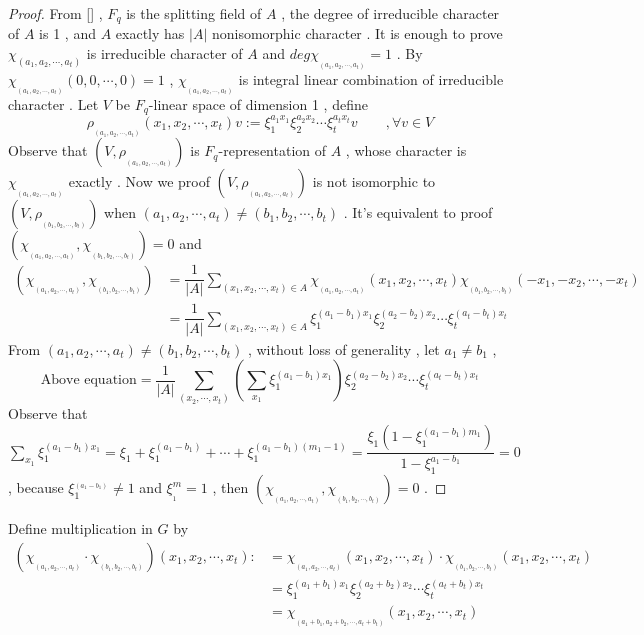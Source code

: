 \documentclass{article}
\begin{document}
\begin{proof}
    From [] , $F_q$ is the splitting field of $A$ , the degree of irreducible character of $A$ is 1 , and $A$ exactly has $|A|$ nonisomorphic character . It is enough to prove $\chi_{(a_1,a_2,\cdots,a_t)}$ is irreducible character of $A$ and $deg\chi_{_{(a_1,a_2,\cdots,a_t)}}=1$ . By $\chi_{_{(a_1,a_2,\cdots,a_t)}}(0,0,\cdots,0)=1$ , $\chi_{_{(a_1,a_2,\cdots,a_t)}}$ is integral linear combination of irreducible character . Let $V$ be $F_q$-linear space of dimension 1 , define 
    \begin{equation*}
        \rho_{_{(a_1,a_2,\cdots,a_t)}}(x_1,x_2,\cdots,x_t)v:=\xi_1^{a_1x_1}\xi_2^{a_2x_2}\cdots\xi_t^{a_tx_t}v\qquad ,\forall v\in{V}
    \end{equation*}
    Observe that $(V,\rho_{_{(a_1,a_2,\cdots,a_t)}})$ is $F_q$-representation of $A$ , whose character is $\chi_{_{(a_1,a_2,\cdots,a_t)}}$ exactly . Now we proof $(V,\rho_{_{(a_1,a_2,\cdots,a_t)}})$ is not isomorphic to $(V,\rho_{_{(b_1,b_2,\cdots,b_t)}})$ when $(a_1,a_2,\cdots,a_t)\neq(b_1,b_2,\cdots,b_t)$ . It's equivalent to proof $(\chi_{_{(a_1,a_2,\cdots,a_t)}},\chi_{_{(b_1,b_2,\cdots,b_t)}})=0$ and
    \begin{align*}
        (\chi_{_{(a_1,a_2,\cdots,a_t)}},\chi_{_{(b_1,b_2,\cdots,b_t)}})&=\dfrac{1}{|A|}\sum_{{(x_1,x_2,\cdots,x_t)}\in{A}}\chi_{_{(a_1,a_2,\cdots,a_t)}}(x_1,x_2,\cdots,x_t)\chi_{_{(b_1,b_2,\cdots,b_t)}}(-x_1,-x_2,\cdots,-x_t)\\
        &=\dfrac{1}{|A|}\sum_{{(x_1,x_2,\cdots,x_t)\in{A}}}\xi_1^{(a_1-b_1)x_1}\xi_2^{(a_2-b_2)x_2}\cdots\xi_t^{(a_t-b_t)x_t}
    \end{align*}
From $(a_1,a_2,\cdots,a_t)\neq(b_1,b_2,\cdots,b_t)$ , without loss of generality , let $a_1\neq b_1$ ,
    \begin{equation*}
        \text{Above equation}=\dfrac{1}{|A|}\sum_{(x_2,\cdots,x_t)}(\sum_{x_1}\xi_1^{(a_1-b_1)x_1})\xi_2^{(a_2-b_2)x_2}\cdots\xi_t^{(a_t-b_t)x_t}
    \end{equation*}
Observe that $\sum\limits_{x_1}\xi_1^{(a_1-b_1)x_1}=\xi_1+\xi_1^{(a_1-b_1)}+\cdots+\xi_1^{(a_1-b_1)(m_1-1)}=\dfrac{\xi_1(1-\xi_1^{(a_1-b_1)m_1})}{1-\xi_1^{a_1-b_1}}=0$ , because $\xi_1^{_{(a_1-b_1)}}\neq 1$ and $\xi_{_1}^{\scriptscriptstyle{m}}=1$ , then $(\chi_{_{(a_1,a_2,\cdots,a_t)}},\chi_{_{(b_1,b_2,\cdots,b_t)}})=0$ .  
\end{proof}
Define multiplication in $G$ by 
\begin{align*}
(\chi_{_{(a_1,a_2,\cdots,a_t)}}\cdot\chi_{_{(b_1,b_2,\cdots,b_t)}})(x_1,x_2,\cdots,x_t):&=\chi_{_{(a_1,a_2,\cdots,a_t)}}(x_1,x_2,\cdots,x_t)\cdot\chi_{_{(b_1,b_2,\cdots,b_t)}}(x_1,x_2,\cdots,x_t)\\
&=\xi_1^{(a_1+b_1)x_1}\xi_2^{(a_2+b_2)x_2}\cdots\xi_t^{(a_t+b_t)x_t}\\
&=\chi_{_{(a_1+b_1,a_2+b_2,\cdots,a_t+b_t)}}(x_1,x_2,\cdots,x_t)
\end{align*}
\end{document}
